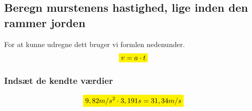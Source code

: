 \subsection{Beregn murstenens hastighed, lige inden den rammer jorden}
For at kunne udregne dett bruger vi formlen nedenunder.
\begin{equation*}
    \mathcolorbox{yellow}{v=a\cdot t}
\end{equation*}
\subsubsection{Indsæt de kendte værdier}
\begin{equation*}
    \mathcolorbox{yellow}{9,82m/s^{2}\cdot 3,191s = 31,34 m/s}
\end{equation*}


\newpage